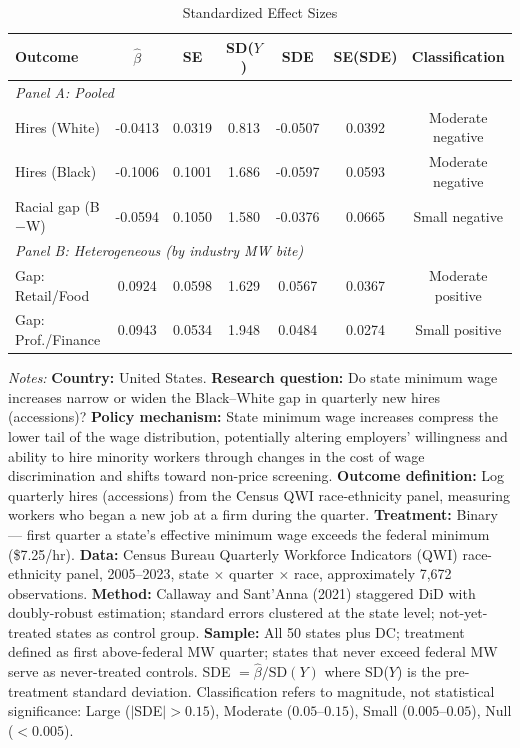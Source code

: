 \begin{table}[htbp]
\centering
\caption{Standardized Effect Sizes}
\label{tab:sde}
\begin{tabular}{lcccccc}
\hline\hline
Outcome & $\hat{\beta}$ & SE & SD($Y$) & SDE & SE(SDE) & Classification \\
\hline
\multicolumn{7}{l}{\textit{Panel A: Pooled}} \\
Hires (White) & -0.0413 & 0.0319 & 0.813 & -0.0507 & 0.0392 & Moderate negative \\
Hires (Black) & -0.1006 & 0.1001 & 1.686 & -0.0597 & 0.0593 & Moderate negative \\
Racial gap (B$-$W) & -0.0594 & 0.1050 & 1.580 & -0.0376 & 0.0665 & Small negative \\
\hline
\multicolumn{7}{l}{\textit{Panel B: Heterogeneous (by industry MW bite)}} \\
Gap: Retail/Food & 0.0924 & 0.0598 & 1.629 & 0.0567 & 0.0367 & Moderate positive \\
Gap: Prof./Finance & 0.0943 & 0.0534 & 1.948 & 0.0484 & 0.0274 & Small positive \\
\hline\hline
\end{tabular}
\begin{tablenotes}[flushleft]\small
\item \textit{Notes:} \textbf{Country:} United States. \textbf{Research question:} Do state minimum wage increases narrow or widen the Black--White gap in quarterly new hires (accessions)? \textbf{Policy mechanism:} State minimum wage increases compress the lower tail of the wage distribution, potentially altering employers' willingness and ability to hire minority workers through changes in the cost of wage discrimination and shifts toward non-price screening. \textbf{Outcome definition:} Log quarterly hires (accessions) from the Census QWI race-ethnicity panel, measuring workers who began a new job at a firm during the quarter. \textbf{Treatment:} Binary --- first quarter a state's effective minimum wage exceeds the federal minimum (\$7.25/hr). \textbf{Data:} Census Bureau Quarterly Workforce Indicators (QWI) race-ethnicity panel, 2005--2023, state $\times$ quarter $\times$ race, approximately 7,672 observations. \textbf{Method:} Callaway and Sant'Anna (2021) staggered DiD with doubly-robust estimation; standard errors clustered at the state level; not-yet-treated states as control group. \textbf{Sample:} All 50 states plus DC; treatment defined as first above-federal MW quarter; states that never exceed federal MW serve as never-treated controls. SDE $= \hat{\beta} / \text{SD}(Y)$ where SD($Y$) is the pre-treatment standard deviation. Classification refers to magnitude, not statistical significance: Large ($|$SDE$| > 0.15$), Moderate ($0.05$--$0.15$), Small ($0.005$--$0.05$), Null ($< 0.005$).
\end{tablenotes}
\end{table}

